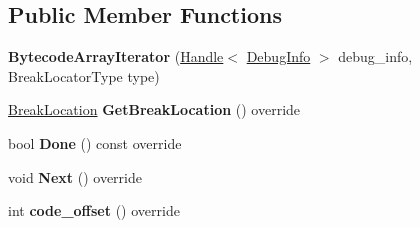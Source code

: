\subsection*{Public Member Functions}
\begin{DoxyCompactItemize}
\item 
{\bfseries Bytecode\+Array\+Iterator} (\hyperlink{classv8_1_1internal_1_1_handle}{Handle}$<$ \hyperlink{classv8_1_1internal_1_1_debug_info}{Debug\+Info} $>$ debug\+\_\+info, Break\+Locator\+Type type)\hypertarget{classv8_1_1internal_1_1_break_location_1_1_bytecode_array_iterator_ac12cdca036b4129e6d20a8fca7854f7e}{}\label{classv8_1_1internal_1_1_break_location_1_1_bytecode_array_iterator_ac12cdca036b4129e6d20a8fca7854f7e}

\item 
\hyperlink{classv8_1_1internal_1_1_break_location}{Break\+Location} {\bfseries Get\+Break\+Location} () override\hypertarget{classv8_1_1internal_1_1_break_location_1_1_bytecode_array_iterator_a776c69cbb24f5a3415b1de5b58fd7b2e}{}\label{classv8_1_1internal_1_1_break_location_1_1_bytecode_array_iterator_a776c69cbb24f5a3415b1de5b58fd7b2e}

\item 
bool {\bfseries Done} () const  override\hypertarget{classv8_1_1internal_1_1_break_location_1_1_bytecode_array_iterator_af3fdbb1cfc8ffdf6fa45c2c0157e815d}{}\label{classv8_1_1internal_1_1_break_location_1_1_bytecode_array_iterator_af3fdbb1cfc8ffdf6fa45c2c0157e815d}

\item 
void {\bfseries Next} () override\hypertarget{classv8_1_1internal_1_1_break_location_1_1_bytecode_array_iterator_afebc8da42810da2636b47016260ca0f6}{}\label{classv8_1_1internal_1_1_break_location_1_1_bytecode_array_iterator_afebc8da42810da2636b47016260ca0f6}

\item 
int {\bfseries code\+\_\+offset} () override\hypertarget{classv8_1_1internal_1_1_break_location_1_1_bytecode_array_iterator_a28b3cca22e9a23bd4280233422554227}{}\label{classv8_1_1internal_1_1_break_location_1_1_bytecode_array_iterator_a28b3cca22e9a23bd4280233422554227}

\end{DoxyCompactItemize}
